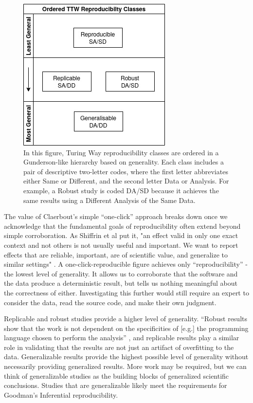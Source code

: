\begin{figure}[htbp]
\centering
\includegraphics[width=.5\textwidth]{figures/repro_outcomes.jpg}
\caption[Hierarchically arranged reproducibility classes]%
{In this figure, Turing Way reproducibility classes are ordered in a
Gunderson-like hierarchy based on generality. Each class includes a pair of
descriptive two-letter codes, where the first letter abbreviates either Same or
Different, and the second letter Data or Analysis. For example, a Robust study
is coded DA/SD because it achieves the same results using a Different Analysis
of the Same Data.}
\label{fig:repro_classes}
\end{figure}

The value of Claerbout’s simple “one-click” approach breaks down once we
acknowledge that the fundamental goals of reproducibility often extend beyond
simple corroboration. As Shiffrin et al put it, "an effect valid in only one
exact context and not others is not usually useful and important. We want to
report effects that are reliable, important, are of scientific value, and
generalize to similar settings" \parencite[2633]{shiffrin_scientific_2018}.
A one-click-reproducible figure achieves only “reproducibility” - the lowest
level of generality. It allows us to corroborate that the software and the data
produce a deterministic result, but tells us nothing meaningful about the
correctness of either. Investigating this further would still require an expert
to consider the data, read the source code, and make their own judgment.

Replicable and robust studies provide a higher level of generality. “Robust
results show that the work is not dependent on the specificities of [e.g.] the
programming language chosen to perform the analysis”
\parencite{community_definitions_2021}, and replicable results
play a similar role in validating that the results are not just an artifact of
overfitting to the data. Generalizable results provide the highest possible
level of generality without necessarily providing generalized results. More work
may be required, but we can think of generalizable studies as the building
blocks of generalized scientific conclusions. Studies that are generalizable
likely meet the requirements for Goodman’s Inferential reproducibility.

